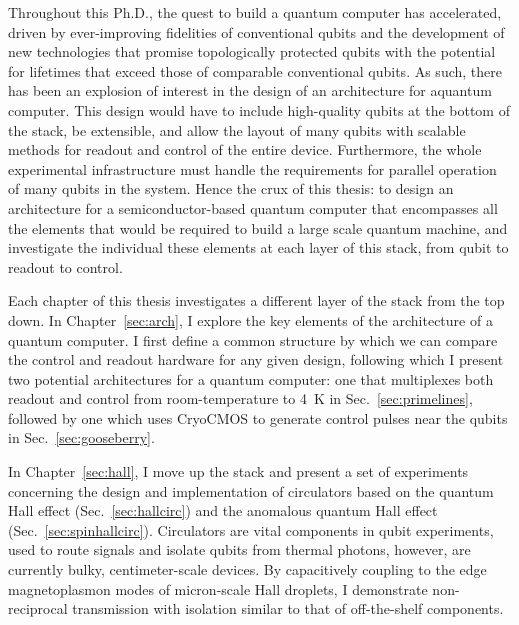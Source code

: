 
Throughout this Ph.D., the quest to build a quantum computer has accelerated, driven by ever-improving fidelities
of conventional qubits and the development of new technologies that promise topologically protected qubits with
the potential for lifetimes that exceed those of comparable conventional qubits. As such, there has been an
explosion of interest in the design of an architecture for aquantum computer. This design would have to include
high-quality qubits at the bottom of the stack, be extensible, and allow the layout of many qubits with scalable
methods for readout and control of the entire device. Furthermore, the whole experimental infrastructure must
handle the requirements for parallel operation of many qubits in the system. Hence the crux of this thesis: to
design an architecture for a semiconductor-based quantum computer that encompasses all the elements that would
be required to build a large scale quantum machine, and investigate the individual these elements at each layer
of this stack, from qubit to readout to control.

Each chapter of this thesis investigates a different layer of the stack from the top down.
In Chapter~\ref{sec:arch}, I explore the key elements of the architecture of a quantum computer.
I first define a common structure by which we can compare the control and readout hardware for
any given design, following which I present two potential architectures for a quantum computer:
one that multiplexes both readout and control from room-temperature to \SI{4}{\kelvin} in
Sec.~\ref{sec:primelines}, followed by one which uses {CryoCMOS} to generate control pulses near the qubits
in Sec.~\ref{sec:gooseberry}.

In Chapter~\ref{sec:hall}, I move up the stack and present a set of experiments concerning the design and
implementation of circulators based on the quantum Hall effect (Sec.~\ref{sec:hallcirc}) and the
anomalous quantum Hall effect (Sec.~\ref{sec:spinhallcirc}). Circulators are vital components in qubit
experiments, used to route signals and isolate qubits from thermal photons, however, are currently bulky,
centimeter-scale devices. By capacitively coupling to the edge magnetoplasmon modes of micron-scale Hall droplets,
I demonstrate non-reciprocal transmission with isolation similar to that of off-the-shelf components.

